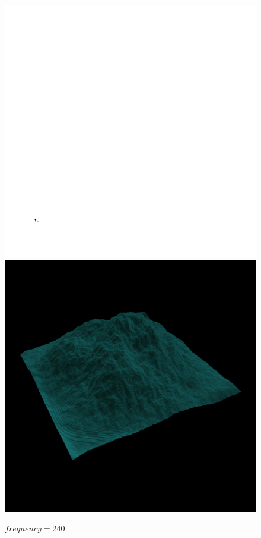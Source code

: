    		\begin{figure}[H]
   			\centering
   			\includegraphics[width=\imagewidth]{images/results/terrains/512-1/perlin/240}
   			\includegraphics[width=\imagewidth]{images/results/terrains/512-1/perlin/240_3d}
  			\caption{$frequency = 240$}
   			\label{fig:ex-perlin240-surface}
   		\end{figure}
   		
